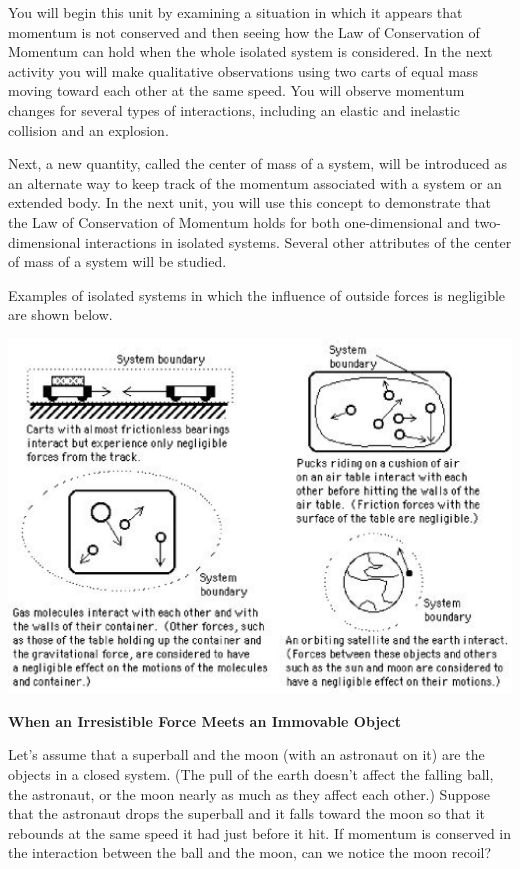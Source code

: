 You will begin this unit by examining a situation in which it appears that momentum
is not conserved and then seeing how the Law of Conservation of Momentum can
hold when the whole isolated system is considered. In the next activity you
will make qualitative observations using two carts of equal mass moving toward
each other at the same speed. You will observe momentum changes for several
types of interactions, including an elastic and inelastic collision and an explosion. 

Next, a new quantity, called the center of mass of a system, will be introduced
as an alternate way to keep track of the momentum associated with a system or
an extended body. In the next unit, you will use this concept to demonstrate
that the Law of Conservation of Momentum holds for both one-dimensional and
two-dimensional interactions in isolated systems. Several other attributes of
the center of mass of a system will be studied.

Examples of isolated systems in which the influence of outside forces is negligible
are shown below.

\vspace{0.3cm}
{\par\centering \includegraphics{mom_cons_fig1.eps} \par}
\vspace{0.3cm}

\textbf{When an Irresistible Force Meets an Immovable Object }

Let's assume that a superball and the moon (with an astronaut on it) are the
objects in a closed system. (The pull of the earth doesn't affect the falling
ball, the astronaut, or the moon nearly as much as they affect each other.)
Suppose that the astronaut drops the superball and it falls toward the moon
so that it rebounds at the same speed it had just before it hit. If momentum
is conserved in the interaction between the ball and the moon, can we notice
the moon recoil? 

